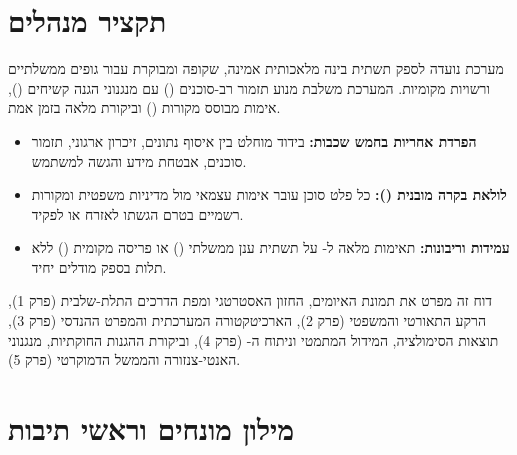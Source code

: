 \documentclass[11pt,a4paper,twoside,openany]{civicshield}
\begin{document}
\chapter*{תקציר מנהלים}

מערכת  נועדה לספק תשתית בינה מלאכותית אמינה, שקופה ומבוקרת עבור גופים ממשלתיים ורשויות מקומיות. המערכת משלבת מנוע תזמור רב-סוכנים () עם מנגנוני הגנה קשיחים (), אימות מבוסס מקורות () וביקורת מלאה בזמן אמת.

\begin{insightbox}
\begin{itemize}[leftmargin=1.5em]
  \item \textbf{הפרדת אחריות בחמש שכבות:} בידוד מוחלט בין איסוף נתונים, זיכרון ארגוני, תזמור סוכנים, אבטחת מידע והגשה למשתמש.
  \item \textbf{לולאת בקרה מובנית ():} כל פלט סוכן עובר אימות עצמאי מול מדיניות משפטית ומקורות רשמיים בטרם הגשתו לאזרח או לפקיד.
  \item \textbf{עמידות וריבונות:} תאימות מלאה ל- על תשתית ענן ממשלתי () או פריסה מקומית () ללא תלות בספק מודלים יחיד.
\end{itemize}
\end{insightbox}

דוח זה מפרט את תמונת האיומים, החזון האסטרטגי ומפת הדרכים התלת-שלבית (פרק 1), הרקע התאורטי והמשפטי (פרק 2), הארכיטקטורה המערכתית והמפרט ההנדסי (פרק 3), תוצאות הסימולציה, המידול המתמטי וניתוח ה- (פרק 4), וביקורת ההגנות החוקתיות, מנגנוני האנטי-צנזורה והממשל הדמוקרטי (פרק 5).

\clearpage
\tableofcontents
\clearpage
\listoffigures
\listoftables

\clearpage
\chapter*{מילון מונחים וראשי תיבות}
\end{document}
